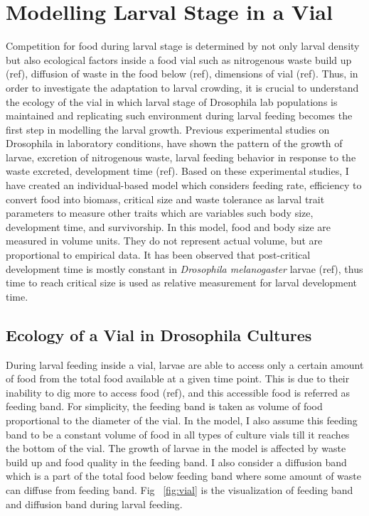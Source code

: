\chapter{Modelling Larval Stage in a Vial}
 Competition for food during larval stage is determined by not only larval density but also ecological factors inside a food vial such as nitrogenous waste build up (ref), diffusion of waste in the food below (ref), dimensions of vial (ref). Thus, in order to investigate the adaptation to larval crowding, it is crucial to understand the ecology of the vial in which larval stage of Drosophila lab populations is maintained and replicating such environment during larval feeding becomes the first step in modelling the larval growth. Previous experimental studies on Drosophila in laboratory conditions, have shown the pattern of the growth of larvae, excretion of nitrogenous waste, larval feeding behavior in response to the waste excreted, development time (ref). Based on these experimental studies, I have created an individual-based model which considers feeding rate, efficiency to convert food into biomass, critical size and waste tolerance as larval trait parameters to measure other traits which are variables such body size, development time, and survivorship. In this model, food and body size are measured in volume units. They do not represent actual volume, but are proportional to empirical data. It has been observed that post-critical development time is mostly constant in \textit{Drosophila melanogaster} larvae (ref), thus time to reach critical size is used as relative measurement for larval development time.
\section{Ecology of a Vial in Drosophila Cultures}
During larval feeding inside a vial, larvae are able to access only a certain amount of food from the total food available at a given time point. This is due to their inability to dig more to access food (ref), and this accessible food is referred as feeding band. For simplicity, the feeding band is taken as volume of food proportional to the diameter of the vial. In the model, I also assume this feeding band to be a constant volume of food in all types of culture vials till it reaches the bottom of the vial. The growth of larvae in the model is affected by waste build up and food quality in the feeding band. I also consider a diffusion band which is a part of the total food below feeding band where some amount of waste can diffuse from feeding band. Fig ~\ref{fig:vial} is the visualization of feeding band and diffusion band during larval feeding.

